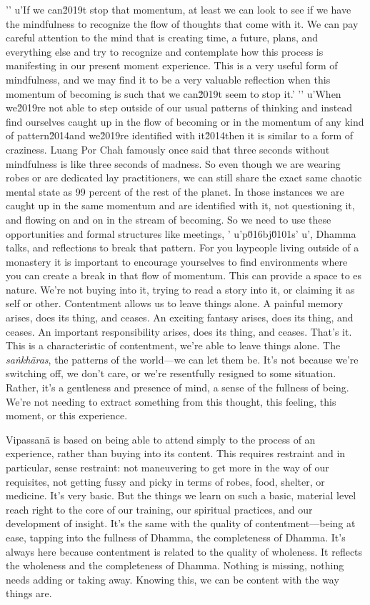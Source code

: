 '\n'
u'If we can\u2019t stop that momentum, at least we can look to see if we have the mindfulness to recognize the flow of thoughts that come with it. We can pay careful attention to the mind that is creating time, a future, plans, and everything else and try to recognize and contemplate how this process is manifesting in our present moment experience. This is a very useful form of mindfulness, and we may find it to be a very valuable reflection when this momentum of becoming is such that we can\u2019t seem to stop it.'
'\n'
u'When we\u2019re not able to step outside of our usual patterns of thinking and instead find ourselves caught up in the flow of becoming or in the momentum of any kind of pattern\u2014and we\u2019re identified with it\u2014then it is similar to a form of craziness. Luang Por Chah famously once said that three seconds without mindfulness is like three seconds of madness. So even though we are wearing robes or are dedicated lay practitioners, we can still share the exact same chaotic mental state as 99 percent of the rest of the planet. In those instances we are caught up in the same momentum and are identified with it, not questioning it, and flowing on and on in the stream of becoming. So we need to use these opportunities and formal structures like meetings, '
u'p\u016bj\u0101s'
u', Dhamma talks, and reflections to break that pattern. For you laypeople living outside of a monastery it is important to encourage yourselves to find environments where you can create a break in that flow of momentum. This can provide a space to es 
nature. We're not buying into it, trying to read a story into it, or 
claiming it as self or other. Contentment allows us to leave things 
alone. A painful memory arises, does its thing, and ceases. An exciting 
fantasy arises, does its thing, and ceases. An important responsibility 
arises, does its thing, and ceases. That's it. This is a characteristic 
of contentment, we're able to leave things alone. The 
\emph{saṅkhāras}, the patterns of the world---we can let them be. 
It's not because we're switching off, we don't care, or we're 
resentfully resigned to some situation. Rather, it's a gentleness and 
presence of mind, a sense of the fullness of being. We're not needing 
to extract something from this thought, this feeling, this moment, or 
this experience.

Vipassanā is based on being able to attend simply to the process of an 
experience, rather than buying into its content. This requires 
restraint and in particular, sense restraint: not maneuvering to get 
more in the way of our requisites, not getting fussy and picky in terms 
of robes, food, shelter, or medicine. It's very basic. But the things 
we learn on such a basic, material level reach right to the core of our 
training, our spiritual practices, and our development of insight. It's 
the same with the quality of contentment---being at ease, tapping into 
the fullness of Dhamma, the completeness of Dhamma. It's always here 
because contentment is related to the quality of wholeness. It reflects 
the wholeness and the completeness of Dhamma. Nothing is missing, 
nothing needs adding or taking away. Knowing this, we can be content 
with the way things are.

